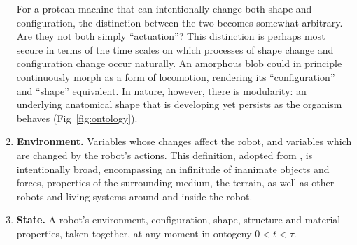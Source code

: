 \begin{enumerate}
    
    For a protean machine that can intentionally change both shape and configuration, the distinction between the two becomes somewhat arbitrary.
    Are they not both simply ``actuation''?
    This distinction is perhaps most secure in terms of the time scales on which processes of shape change 
    and configuration change 
    occur naturally.
    An amorphous blob could in principle continuously morph as a form of locomotion, rendering its ``configuration'' and ``shape'' equivalent.
    In nature, however, there is modularity: an underlying anatomical shape that is developing yet persists as the organism behaves (Fig~\ref{fig:ontology}).
    
    
    \item \textbf{Environment.}
    Variables whose changes affect the robot, 
    and variables which are changed by the robot's actions.
    This definition, adopted from \citet{ashby1952design}, is intentionally broad, encompassing an infinitude of inanimate objects and forces, 
    properties of the surrounding medium,
    the terrain,
    as well as other robots and living systems around and inside the robot.
    
    \item \textbf{State.}
    A robot's environment, configuration, shape, structure and material properties, taken together, at any moment in ontogeny $0<t<\tau$.
    

\end{enumerate}
